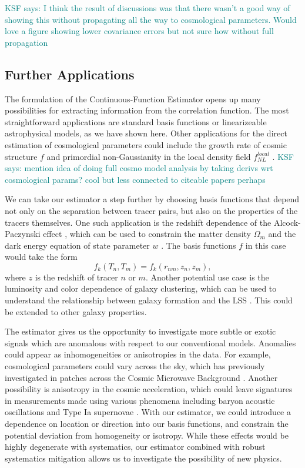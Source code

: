 \documentclass[modern]{aastex62}
\newcommand{\est}{the Continuous-Function Estimator\xspace}
\newcommand{\KSF}[1]{\textcolor{teal}{KSF says: #1}}
\begin{document}
\KSF{I think the result of discussions was that there wasn't a good way of showing this without propagating all the way to cosmological parameters. Would love a figure showing lower covariance errors but not sure how without full propagation}

\subsection{Further Applications}

The formulation of \est opens up many possibilities for extracting information from the correlation function.
The most straightforward applications are standard basis functions or linearizeable astrophysical models, as we have shown here.
Other applications for the direct estimation of cosmological parameters could include the growth rate of cosmic structure $f$ \citep{Satpathy2016, Reid2018} and primordial non-Gaussianity in the local density field $f^{local}_{NL}$ \citep{Karagiannis2014}.
\KSF{mention idea of doing full cosmo model analysis by taking derivs wrt cosmological params? cool but less connected to citeable papers perhaps}

We can take our estimator a step further by choosing basis functions that depend not only on the separation between tracer pairs, but also on the properties of the tracers themselves.
One such application is the redshift dependence of the Alcock-Paczynski effect \cite{AlcockPaczynski1979}, which can be used to constrain the matter density $\Omega_m$ and the dark energy equation of state parameter $w$ \citep{Li2016}.
The basis functions $f$ in this case would take the form
\begin{equation}
    f_k(T_n, T_m) = f_k(r_{nm}, z_n, z_m),
\end{equation}
where $z$ is the redshift of tracer $n$ or $m$.
Another potential use case is the luminosity and color dependence of galaxy clustering, which can be used to understand the relationship between galaxy formation and the LSS \citep{Zehavi2011}.
This could be extended to other galaxy properties.

The estimator gives us the opportunity to investigate more subtle or exotic signals which are anomalous with respect to our conventional models.
Anomalies could appear as inhomogeneities or anisotropies in the data.
For example, cosmological parameters could vary across the sky, which has previously investigated in patches across the Cosmic Microwave Background \citep{MukherjeeWandelt2018}.
Another possibility is anisotropy in the cosmic acceleration, which could leave signatures in measurements made using various phenomena including baryon acoustic oscillations \citep{Faltenbacher2012} and Type Ia supernovae \citep{Colin2019}.
With our estimator, we could introduce a dependence on location or direction into our basis functions, and constrain the potential deviation from homogeneity or isotropy.
While these effects would be highly degenerate with systematics, our estimator combined with robust systematics mitigation allows us to investigate the possibility of new physics.
\end{document}
